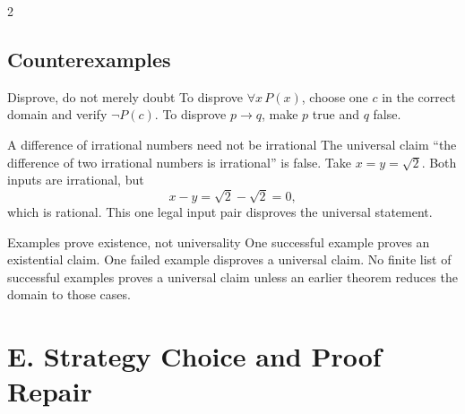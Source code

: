 \documentclass[10pt]{article}
\begin{document}
\begin{multicols}{2}
\subsection*{Counterexamples}

\begin{methodbox}{Disprove, do not merely doubt}
To disprove $\forall x\,P(x)$, choose one $c$ in the correct domain and verify
$\neg P(c)$. To disprove $p\to q$, make $p$ true and $q$ false.
\end{methodbox}

\begin{workedbox}{A difference of irrational numbers need not be irrational}
The universal claim ``the difference of two irrational numbers is irrational''
is false. Take $x=y=\sqrt2$. Both inputs are irrational, but
\[
 x-y=\sqrt2-\sqrt2=0,
\]
which is rational. This one legal input pair disproves the universal statement.
\end{workedbox}

\begin{warningbox}{Examples prove existence, not universality}
One successful example proves an existential claim. One failed example
disproves a universal claim. No finite list of successful examples proves a
universal claim unless an earlier theorem reduces the domain to those cases.
\end{warningbox}
\end{multicols}

\clearpage
\section*{E. Strategy Choice and Proof Repair}
\end{document}
